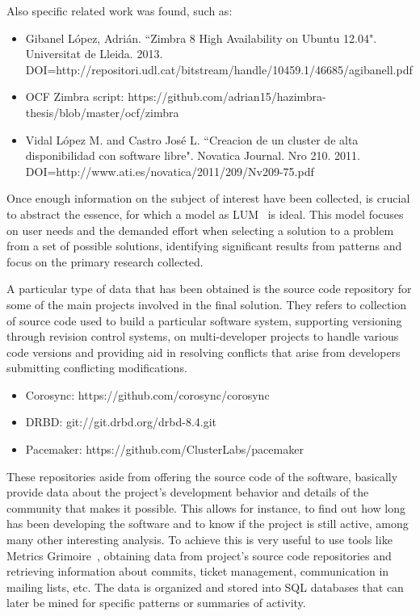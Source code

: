 \documentclass[a4paper, 12pt]{book}
\begin{document}
\noindent Also specific related work was found, such as:

\begin{itemize}
	\item Gibanel L\'opez, Adri\'an. ``Zimbra 8 High Availability on Ubuntu 12.04". Universitat de Lleida. 2013. DOI=http://repositori.udl.cat/bitstream/handle/10459.1/46685/agibanell.pdf
	\item OCF Zimbra script: https://github.com/adrian15/hazimbra-thesis/blob/master/ocf/zimbra
	\item Vidal L\'opez M. and Castro Jos\'e L. ``Creacion de un cluster de alta disponibilidad con software libre". Novatica Journal. Nro 210. 2011. \\
	DOI=http://www.ati.es/novatica/2011/209/Nv209-75.pdf
\end{itemize}

\noindent Once enough information on the subject of interest have been collected, is crucial to abstract the essence, for which a model as LUM~\cite{CandT1} is ideal. This model focuses on user needs and the demanded effort when selecting a solution to a problem from a set of possible solutions, identifying significant results from patterns and focus on the primary research collected.\bigskip

\noindent A particular type of data that has been obtained is the source code repository for some of the main projects involved in the final solution. They refers to collection of source code used to build a particular software system, supporting versioning through revision control systems, on multi-developer projects to handle various code versions and providing aid in resolving conflicts that arise from developers submitting conflicting modifications.

\begin{itemize}
	\item Corosync: https://github.com/corosync/corosync
	\item DRBD: git://git.drbd.org/drbd-8.4.git
	\item Pacemaker: https://github.com/ClusterLabs/pacemaker
\end{itemize}

\noindent These repositories aside from offering the source code of the software, basically provide data about the project's development behavior and details of the community that makes it possible. This allows for instance, to find out how long has been developing the software and to know if the project is still active, among many other interesting analysis. To achieve this is very useful to use tools like Metrics Grimoire~\cite{GSyC}, obtaining data from project's source code repositories and retrieving information about commits, ticket management, communication in mailing lists, etc. The data is organized and stored into SQL databases that can later be mined for specific patterns or summaries of activity. \bigskip
\end{document}

